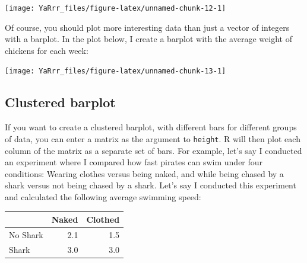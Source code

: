 \documentclass[]{book}
\newenvironment{Shaded}{\begin{snugshade}}{\end{snugshade}}
\newcommand{\KeywordTok}[1]{\textcolor[rgb]{0.13,0.29,0.53}{\textbf{{#1}}}}
\newcommand{\DataTypeTok}[1]{\textcolor[rgb]{0.13,0.29,0.53}{{#1}}}
\newcommand{\StringTok}[1]{\textcolor[rgb]{0.31,0.60,0.02}{{#1}}}
\newcommand{\CommentTok}[1]{\textcolor[rgb]{0.56,0.35,0.01}{\textit{{#1}}}}
\newcommand{\NormalTok}[1]{{#1}}
\theoremstyle{definition}
\theoremstyle{definition}
\theoremstyle{remark}
\begin{document}
\begin{center}\texttt{[image: YaRrr\_files/figure-latex/unnamed-chunk-12-1]} \end{center}

Of course, you should plot more interesting data than just a vector of
integers with a barplot. In the plot below, I create a barplot with the
average weight of chickens for each week:

\begin{Shaded}
\end{Shaded}

\begin{center}\texttt{[image: YaRrr\_files/figure-latex/unnamed-chunk-13-1]} \end{center}

\subsection{Clustered barplot}\label{clustered-barplot}

If you want to create a clustered barplot, with different bars for
different groups of data, you can enter a matrix as the argument to
\texttt{height}. R will then plot each column of the matrix as a
separate set of bars. For example, let's say I conducted an experiment
where I compared how fast pirates can swim under four conditions:
Wearing clothes versus being naked, and while being chased by a shark
versus not being chased by a shark. Let's say I conducted this
experiment and calculated the following average swimming speed:

\begin{tabular}{l|r|r}
\hline
  & Naked & Clothed\\
\hline
No Shark & 2.1 & 1.5\\
\hline
Shark & 3.0 & 3.0\\
\hline
\end{tabular}
\end{document}
